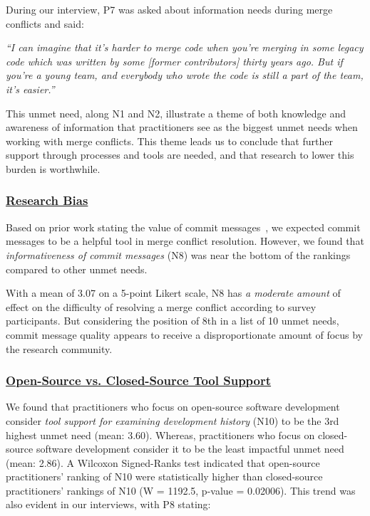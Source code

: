 During our interview, P7 was asked about information needs during merge conflicts and said:
\begin{displayquote}
\textit{``I can imagine that it's harder to merge code when you're merging in some legacy code which was written by some [former contributors] thirty years ago. But if you're a young team, and everybody who wrote the code is still a part of the team, it's easier.''}
\end{displayquote}

This unmet need, along N1 and N2, illustrate a theme of both knowledge and awareness of information that practitioners see as the biggest unmet needs when working with merge conflicts.
This theme leads us to conclude that further support through processes and tools are needed, and that research to lower this burden is worthwhile.

\subsubsection{\underline{Research Bias}}
Based on prior work stating the value of commit messages~\cite{yamauchi2014clustering}\cite{hindle2009automatic}\cite{cortes2014automatically}\cite{hattori2008nature}, we expected commit messages to be a helpful tool in merge conflict resolution.
However, we found that \textit{informativeness of commit messages} (N8) was near the bottom of the rankings compared to other unmet needs.

With a mean of 3.07 on a 5-point Likert scale, N8 has \textit{a moderate amount} of effect on the difficulty of resolving a merge conflict according to survey participants.
But considering the position of 8th in a list of 10 unmet needs, commit message quality appears to receive a disproportionate amount of focus by the research community.



\subsubsection{\underline{Open-Source vs. Closed-Source Tool Support}}
\label{oss_vs_closed_tool_support} 

We found that practitioners who focus on open-source software development consider \textit{tool support for examining development history} (N10) to be the 3rd highest unmet need (mean: 3.60).
Whereas, practitioners who focus on closed-source software development consider it to be the least impactful unmet need (mean: 2.86).
A Wilcoxon Signed-Ranks test indicated that open-source practitioners' ranking of N10 were statistically higher than closed-source practitioners' rankings of N10 (W = 1192.5, p-value = 0.02006).
This trend was also evident in our interviews, with P8 stating:

